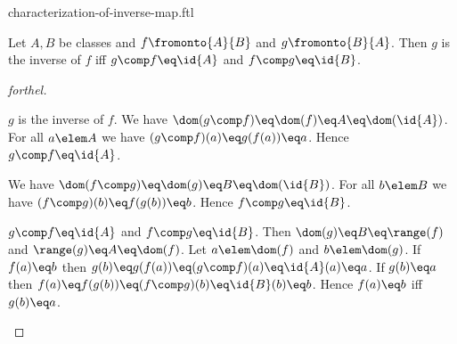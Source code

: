 \documentclass{naproche-library}
\begin{document}
\begin{smodule}[title=Characterization of the Inverse Map]{characterization-of-inverse-map.ftl}


\begin{proposition}[forthel,id=CharacterizationOfInvProp]
  Let $A, B$ be classes and $f \fromonto{A}{B}$ and $g \fromonto{B}{A}$.
  Then $g$ is the inverse of $f$ iff $g \comp f \eq \id{A}$ and $f \comp g \eq \id{B}$.
\end{proposition}
\begin{proof}[forthel]
  \begin{case}{$g$ is the inverse of $f$.}
    We have
    $\dom(g \comp f)
      \eq \dom(f)
      \eq A
      \eq \dom(\id{A})$.
    For all $a \elem A$ we have
    $(g \comp f)(a)
      \eq g(f(a))
      \eq a$.
    Hence $g \comp f \eq \id{A}$.

    We have
    $\dom(f \comp g)
      \eq \dom(g)
      \eq B
      \eq \dom(\id{B})$.
    For all $b \elem B$ we have
    $(f \comp g)(b)
      \eq f(g(b))
      \eq b$.
    Hence $f \comp g \eq \id{B}$.
  \end{case}

  \begin{case}{$g \comp f \eq \id{A}$ and $f \comp g \eq \id{B}$.}
    Then $\dom(g)
      \eq B
      \eq \range(f)$
    and $\range(g)
      \eq A
      \eq \dom(f)$.
    Let $a \elem \dom(f)$ and $b \elem \dom(g)$.
    If $f(a) \eq b$ then
    $g(b)
      \eq g(f(a))
      \eq (g \comp f)(a)
      \eq \id{A}(a)
      \eq a$.
    If $g(b) \eq a$ then
    $f(a)
      \eq f(g(b))
      \eq (f \comp g)(b)
      \eq \id{B}(b)
      \eq b$.
    Hence $f(a) \eq b$ iff $g(b) \eq a$.
  \end{case}
\end{proof}

\end{smodule}
\end{document}

